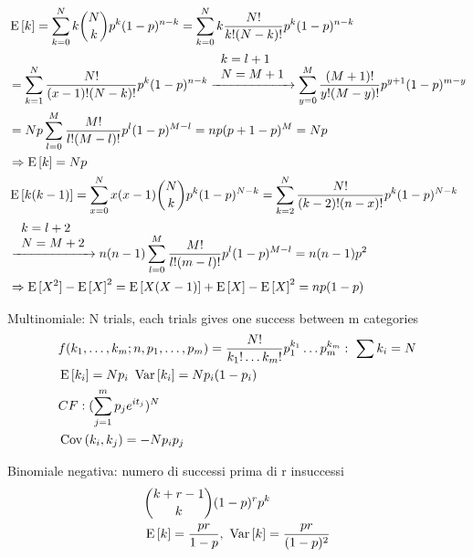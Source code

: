 \documentclass[asd-beamer.tex]{subfiles}%
\begin{document}
\begin{frame}{}
\begin{align*}
&\operatorname{E}{[k]}=\sum_{k=0}^Nk\binom{N}{k}p^k(1-p)^{n-k}=\sum_{k=0}^Nk\frac{N!}{k!(N-k)!}p^k(1-p)^{n-k}\\
&=\sum_{k=1}^N\frac{N!}{(x-1)!(N-k)!}p^k(1-p)^{n-k}\xrightarrow{\begin{array}{l}k=l+1\\N=M+1\\\end{array}}\sum_{y=0}^M\frac{(M+1)!}{y!(M-y)!}p^{y+1}(1-p)^{m-y}\\
&=Np\sum_{l=0}^M\frac{M!}{l!(M-l)!}p^l(1-p)^{M-l}=np(p+1-p)^M=Np\\
&\Rightarrow\operatorname{E}{[k]}=Np\\
&\operatorname{E}{[k(k-1)]}=\sum_{x=0}^Nx(x-1)\binom{N}{k}p^k(1-p)^{N-k}=\sum_{k=2}^N\frac{N!}{(k-2)!(n-x)!}p^k(1-p)^{N-k}\\
&\xrightarrow{\begin{array}{l}k=l+2\\N=M+2\\\end{array}}n(n-1)\sum_{l=0}^M\frac{M!}{l!(m-l)!}p^l(1-p)^{M-l}=n(n-1)p^2\\
&\Rightarrow\operatorname{E}{[X^2]}-\operatorname{E}{[X]}^2=\operatorname{E}{[X(X-1)]}+\operatorname{E}{[X]}-\operatorname{E}{[X]}^2=np(1-p)
\end{align*}
\end{frame}

\begin{frame}{}
\begin{block}{Multinomiale: N trials, each trials gives one success between m categories}
	\begin{align*}
	&f(k_1,\ldots,k_m;n,p_1,\ldots,p_m)=\frac{N!}{k_1!\ldots k_m!}p_1^{k_1}\ldots p_m^{k_m}:\ \sum k_i=N\\
	&\operatorname{E}{[k_i]}=Np_i\ \operatorname{Var}{[k_i]}=Np_i(1-p_i)\\
    &CF: (\sum_{j=1}^mp_je^{it_j})^N\\
    &\operatorname{Cov}{(k_i,k_j)}=-Np_ip_j
\end{align*}
\end{block}
\begin{block}{Binomiale negativa: numero di successi prima di r insuccessi}
    \begin{align*}
        &\binom{k+r-1}{k}(1-p)^rp^k\\
        &\operatorname{E}{[k]}=\frac{pr}{1-p},\ \operatorname{Var}{[k]}=\frac{pr}{(1-p)^2}
    \end{align*}
\end{block}
\end{frame}
\end{document}
